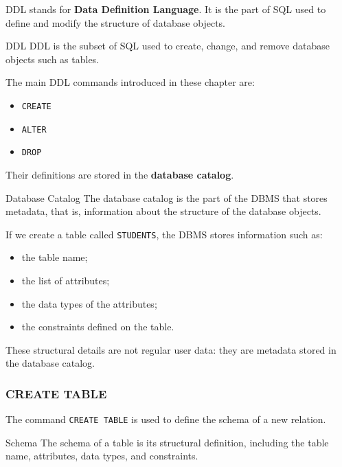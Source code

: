  DDL stands for \textbf{Data Definition Language}. It is the part of SQL used to define and modify the structure of database objects.

 \begin{defbox}{DDL}
  DDL is the subset of SQL used to create, change, and remove database objects such as tables.
 \end{defbox}

 The main DDL commands introduced in these chapter are:
 \begin{itemize}
  \item \texttt{CREATE}
  \item \texttt{ALTER}
  \item \texttt{DROP}
 \end{itemize}

 Their definitions are stored in the \textbf{database catalog}.

 \begin{defbox}{Database Catalog}
  The database catalog is the part of the DBMS that stores metadata, that is, information about the structure of the database objects.
 \end{defbox}

 \vs
 \begin{example}
  If we create a table called \texttt{STUDENTS}, the DBMS stores information such as:
  \begin{itemize}
   \item the table name;
   \item the list of attributes;
   \item the data types of the attributes;
   \item the constraints defined on the table.
  \end{itemize}

  These structural details are not regular user data: they are metadata stored in the database catalog.
 \end{example}

 \subsubsection{CREATE TABLE}

 The command \texttt{CREATE TABLE} is used to define the schema of a new relation.

 \begin{defbox}{Schema}
  The schema of a table is its structural definition, including the table name, attributes, data types, and constraints.
 \end{defbox}

